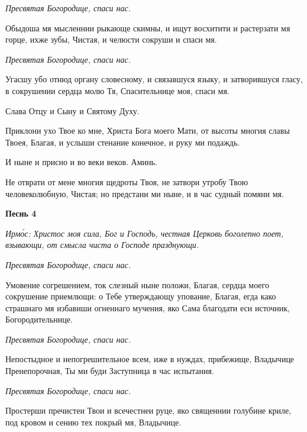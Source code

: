  \itshape  Пресвятая Богородице, спаси нас.
\normalfont{}


   Обыдоша мя мысленнии рыкающе скимны, и ищут восхитити и
растерзати мя горце, ихже зубы, Чистая, и челюсти сокруши и спаси
мя.



 \itshape  Пресвятая Богородице, спаси нас.
\normalfont{}


   Угасшу убо отнюд органу словесному, и связавшуся языку, и
затворившуся гласу, в сокрушении сердца молю Тя, Спасительнице моя,
спаси мя.



   Слава Отцу и Сыну и Святому Духу.



   Приклони ухо Твое ко мне, Христа Бога моего Мати, от высоты
многия славы Твоея, Благая, и услыши стенание конечное, и руку ми
подаждь.



   И ныне и присно и во веки веков. Аминь.



   Не отврати от мене многия щедроты Твоя, не затвори утробу Твою
человеколюбную, Чистая; но предстани ми ныне, и в час судный помяни
мя.



 

\bfseries Песнь 4\normalfont{}


 \itshape Ирмо́с:\normalfont{} Христос моя сила, Бог и Господь, честная Церковь боголепно поет,
взывающи, от смысла чиста о Господе празднующи.



 \itshape  Пресвятая Богородице, спаси нас.

\normalfont{}


   Умовение согрешением, ток слезный ныне положи, Благая, сердца моего
сокрушение приемлющи: о Тебе утверждающу упование, Благая, егда како
страшнаго мя избавиши огненнаго мучения, яко Сама благодати еси
источник, Богородительнице.



 \itshape  Пресвятая Богородице, спаси нас.
\normalfont{}


   Непостыдное и непогрешительное всем, иже в нуждах, прибежище,
Владычице Пренепорочная, Ты ми буди Заступница в час испытания.



 \itshape  Пресвятая Богородице, спаси нас.
\normalfont{}


   Простерши пречистеи Твои и всечестнеи руце, яко священнии голубине
криле, под кровом и сению тех покрый мя, Владычице.




